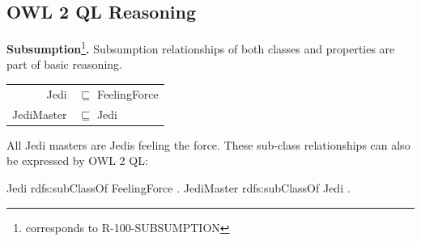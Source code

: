 \documentclass{llncs}
\newcommand{\ms}[1]{\texttt{#1}}
\newenvironment{DL}{
  \begin{tabular}{r l}

}{
  \end{tabular}
  \linebreak
}
\begin{document}
%

\subsection{OWL 2 QL Reasoning}

\textbf{Subsumption}\footnote{corresponds to R-100-SUBSUMPTION}\textbf{.}
Subsumption relationships of both classes and properties are part of basic reasoning.

\begin{center}
\begin{DL}
Jedi &$\sqsubseteq$ FeelingForce \\
JediMaster &$\sqsubseteq$ Jedi \\
\end{DL}
\end{center}

All Jedi masters are Jedis feeling the force.
These sub-class relationships can also be expressed by OWL 2 QL:

\begin{ex}
Jedi rdfs:subClassOf FeelingForce . 
JediMaster rdfs:subClassOf Jedi . 
\end{ex}
\end{document}
